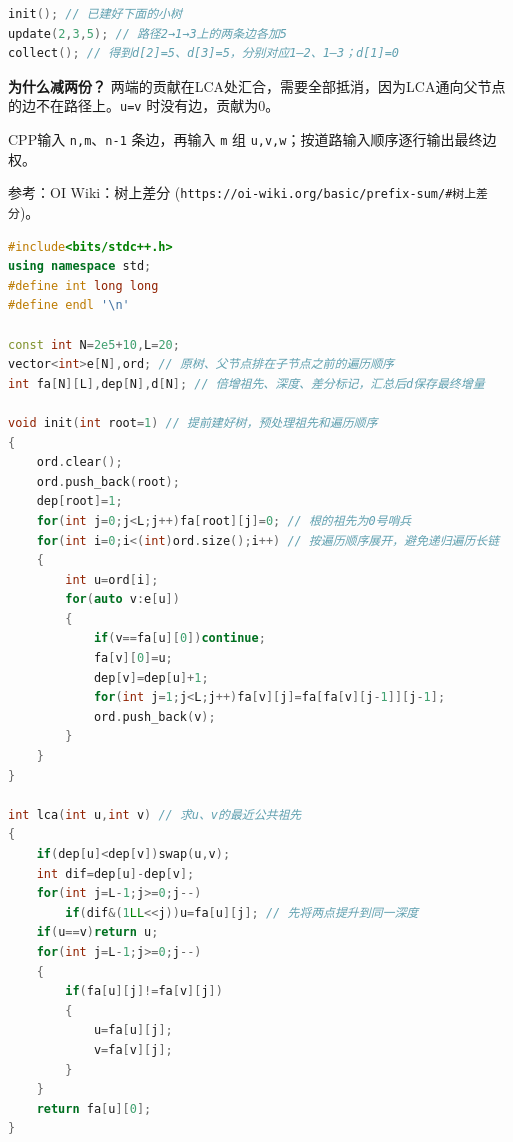 \documentclass[10pt,landscape,a4paper]{article}
\begin{document}
\begin{multicols*}{3}
\begin{lstlisting}[language=C++,numbers=none,basicstyle=\footnotesize\ttfamily]
init(); // 已建好下面的小树
update(2,3,5); // 路径2→1→3上的两条边各加5
collect(); // 得到d[2]=5、d[3]=5，分别对应1—2、1—3；d[1]=0
\end{lstlisting}

\textbf{为什么减两份？} 两端的贡献在LCA处汇合，需要全部抵消，因为LCA通向父节点的边不在路径上。\texttt{u\allowbreak{}=\allowbreak{}v} 时没有边，贡献为0。\par
CPP输入 \texttt{n\allowbreak{},\allowbreak{}m}、\texttt{n\allowbreak{}-\allowbreak{}1} 条边，再输入 \texttt{m} 组 \texttt{u\allowbreak{},\allowbreak{}v\allowbreak{},\allowbreak{}w}；按道路输入顺序逐行输出最终边权。\par
参考：OI Wiki：树上差分 (\texttt{h\allowbreak{}t\allowbreak{}t\allowbreak{}p\allowbreak{}s\allowbreak{}:\allowbreak{}/\allowbreak{}/\allowbreak{}o\allowbreak{}i\allowbreak{}-\allowbreak{}w\allowbreak{}i\allowbreak{}k\allowbreak{}i\allowbreak{}.\allowbreak{}o\allowbreak{}r\allowbreak{}g\allowbreak{}/\allowbreak{}b\allowbreak{}a\allowbreak{}s\allowbreak{}i\allowbreak{}c\allowbreak{}/\allowbreak{}p\allowbreak{}r\allowbreak{}e\allowbreak{}f\allowbreak{}i\allowbreak{}x\allowbreak{}-\allowbreak{}s\allowbreak{}u\allowbreak{}m\allowbreak{}/\allowbreak{}\#\allowbreak{}树\allowbreak{}上\allowbreak{}差\allowbreak{}分})。\par
\par{}\par
\begin{lstlisting}[language=C++]
#include<bits/stdc++.h>
using namespace std;
#define int long long
#define endl '\n'

const int N=2e5+10,L=20;
vector<int>e[N],ord; // 原树、父节点排在子节点之前的遍历顺序
int fa[N][L],dep[N],d[N]; // 倍增祖先、深度、差分标记，汇总后d保存最终增量

void init(int root=1) // 提前建好树，预处理祖先和遍历顺序
{
    ord.clear();
    ord.push_back(root);
    dep[root]=1;
    for(int j=0;j<L;j++)fa[root][j]=0; // 根的祖先为0号哨兵
    for(int i=0;i<(int)ord.size();i++) // 按遍历顺序展开，避免递归遍历长链
    {
        int u=ord[i];
        for(auto v:e[u])
        {
            if(v==fa[u][0])continue;
            fa[v][0]=u;
            dep[v]=dep[u]+1;
            for(int j=1;j<L;j++)fa[v][j]=fa[fa[v][j-1]][j-1];
            ord.push_back(v);
        }
    }
}

int lca(int u,int v) // 求u、v的最近公共祖先
{
    if(dep[u]<dep[v])swap(u,v);
    int dif=dep[u]-dep[v];
    for(int j=L-1;j>=0;j--)
        if(dif&(1LL<<j))u=fa[u][j]; // 先将两点提升到同一深度
    if(u==v)return u;
    for(int j=L-1;j>=0;j--)
    {
        if(fa[u][j]!=fa[v][j])
        {
            u=fa[u][j];
            v=fa[v][j];
        }
    }
    return fa[u][0];
}


\end{lstlisting}
\end{multicols*}
\end{document}

